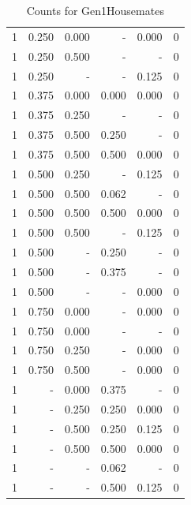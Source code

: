 \documentclass[a4paper]{article}\usepackage[]{graphicx}\usepackage[]{color}
\begin{document}
\begin{table}[ht]
\begin{tabular}{rrrrrr}
  1 & 0.250 & 0.000 & - & 0.000 & 0 \\ 
  1 & 0.250 & 0.500 & - & - & 0 \\ 
   \rowcolor{nullColor} 1 & 0.250 & - & - & 0.125 & 0 \\ 
   \rowcolor{goodColor} 1 & 0.375 & 0.000 & 0.000 & 0.000 & 0 \\ 
  1 & 0.375 & 0.250 & - & - & 0 \\ 
   \rowcolor{badColor} 1 & 0.375 & 0.500 & 0.250 & - & 0 \\ 
   \rowcolor{goodColor} 1 & 0.375 & 0.500 & 0.500 & 0.000 & 0 \\ 
  1 & 0.500 & 0.250 & - & 0.125 & 0 \\ 
   \rowcolor{badColor} 1 & 0.500 & 0.500 & 0.062 & - & 0 \\ 
   \rowcolor{goodColor} 1 & 0.500 & 0.500 & 0.500 & 0.000 & 0 \\ 
  1 & 0.500 & 0.500 & - & 0.125 & 0 \\ 
   \rowcolor{sosoColor} 1 & 0.500 & - & 0.250 & - & 0 \\ 
   \rowcolor{sosoColor} 1 & 0.500 & - & 0.375 & - & 0 \\ 
   \rowcolor{nullColor} 1 & 0.500 & - & - & 0.000 & 0 \\ 
  1 & 0.750 & 0.000 & - & 0.000 & 0 \\ 
  1 & 0.750 & 0.000 & - & - & 0 \\ 
  1 & 0.750 & 0.250 & - & 0.000 & 0 \\ 
  1 & 0.750 & 0.500 & - & 0.000 & 0 \\ 
   \rowcolor{badColor} 1 & - & 0.000 & 0.375 & - & 0 \\ 
   \rowcolor{goodColor} 1 & - & 0.250 & 0.250 & 0.000 & 0 \\ 
   \rowcolor{badColor} 1 & - & 0.500 & 0.250 & 0.125 & 0 \\ 
   \rowcolor{goodColor} 1 & - & 0.500 & 0.500 & 0.000 & 0 \\ 
   \rowcolor{sosoColor} 1 & - & - & 0.062 & - & 0 \\ 
   \rowcolor{sosoColor} 1 & - & - & 0.500 & 0.125 & 0 \\ 
   \hline
\end{tabular}
\caption{Counts for Gen1Housemates} 
\end{table}
\end{document}

